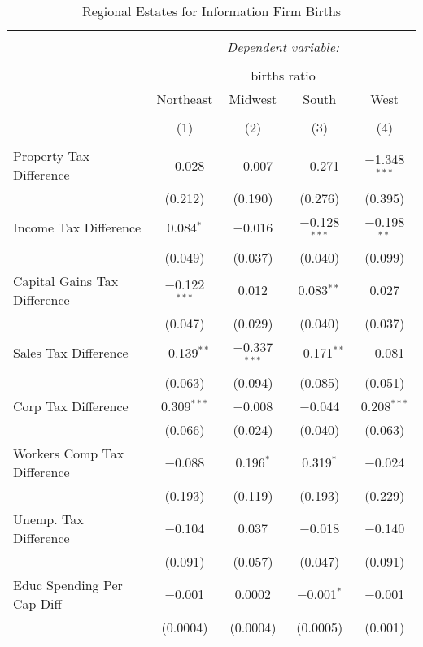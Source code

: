 
\begin{table}[!htbp] \centering 
  \caption{Regional Estates for  Information Firm Births} 
  \label{} 
\begin{tabular}{@{\extracolsep{5pt}}lcccc} 
\\[-1.8ex]\hline 
\hline \\[-1.8ex] 
 & \multicolumn{4}{c}{\textit{Dependent variable:}} \\ 
\cline{2-5} 
\\[-1.8ex] & \multicolumn{4}{c}{births ratio} \\ 
 & Northeast & Midwest & South & West \\ 
\\[-1.8ex] & (1) & (2) & (3) & (4)\\ 
\hline \\[-1.8ex] 
 Property Tax Difference & $-$0.028 & $-$0.007 & $-$0.271 & $-$1.348$^{***}$ \\ 
  & (0.212) & (0.190) & (0.276) & (0.395) \\ 
  Income Tax Difference & 0.084$^{*}$ & $-$0.016 & $-$0.128$^{***}$ & $-$0.198$^{**}$ \\ 
  & (0.049) & (0.037) & (0.040) & (0.099) \\ 
  Capital Gains Tax Difference & $-$0.122$^{***}$ & 0.012 & 0.083$^{**}$ & 0.027 \\ 
  & (0.047) & (0.029) & (0.040) & (0.037) \\ 
  Sales Tax Difference & $-$0.139$^{**}$ & $-$0.337$^{***}$ & $-$0.171$^{**}$ & $-$0.081 \\ 
  & (0.063) & (0.094) & (0.085) & (0.051) \\ 
  Corp Tax Difference & 0.309$^{***}$ & $-$0.008 & $-$0.044 & 0.208$^{***}$ \\ 
  & (0.066) & (0.024) & (0.040) & (0.063) \\ 
  Workers Comp Tax Difference & $-$0.088 & 0.196$^{*}$ & 0.319$^{*}$ & $-$0.024 \\ 
  & (0.193) & (0.119) & (0.193) & (0.229) \\ 
  Unemp. Tax Difference & $-$0.104 & 0.037 & $-$0.018 & $-$0.140 \\ 
  & (0.091) & (0.057) & (0.047) & (0.091) \\ 
  Educ Spending Per Cap Diff & $-$0.001 & 0.0002 & $-$0.001$^{*}$ & $-$0.001 \\ 
  & (0.0004) & (0.0004) & (0.0005) & (0.001) \\ 

\end{tabular}
\end{table}
